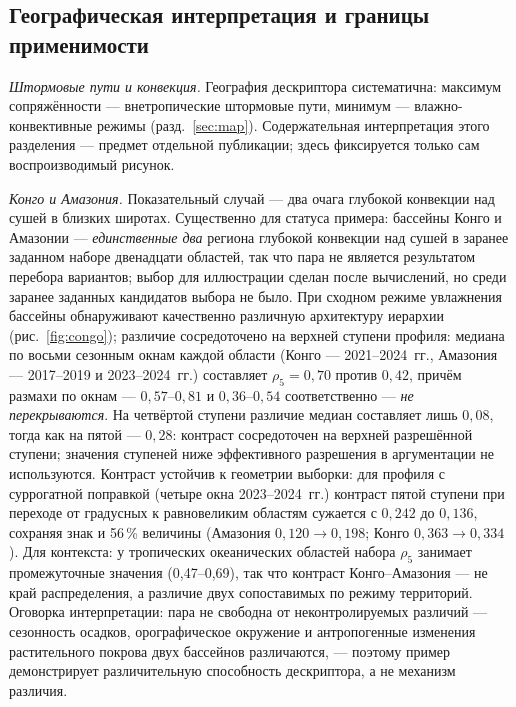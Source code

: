 \documentclass[11pt,a4paper]{article}
\begin{document}
\subsection{Географическая интерпретация и границы применимости}
\label{sec:geo}

\emph{Штормовые пути и конвекция.} География дескриптора систематична: максимум сопряжённости --- внетропические штормовые пути, минимум --- влажно-конвективные режимы (разд.~\ref{sec:map}). Содержательная интерпретация этого разделения --- предмет отдельной публикации; здесь фиксируется только сам воспроизводимый рисунок.

\emph{Конго и Амазония.} Показательный случай --- два очага глубокой конвекции над сушей в близких широтах. Существенно для статуса примера: бассейны Конго и Амазонии --- \emph{единственные два} региона глубокой конвекции над сушей в заранее заданном наборе двенадцати областей, так что пара не является результатом перебора вариантов; выбор для иллюстрации сделан после вычислений, но среди заранее заданных кандидатов выбора не было. При сходном режиме увлажнения бассейны обнаруживают качественно различную архитектуру иерархии (рис.~\ref{fig:congo}); различие сосредоточено на верхней ступени профиля: медиана по восьми сезонным окнам каждой области (Конго --- 2021--2024~гг., Амазония --- 2017--2019 и 2023--2024~гг.) составляет $\rho_5=0{,}70$ против $0{,}42$, причём размахи по окнам --- $0{,}57$--$0{,}81$ и $0{,}36$--$0{,}54$ соответственно --- \emph{не перекрываются}. На четвёртой ступени различие медиан составляет лишь $0{,}08$, тогда как на пятой --- $0{,}28$: контраст сосредоточен на верхней разрешённой ступени; значения ступеней ниже эффективного разрешения в аргументации не используются. Контраст устойчив к геометрии выборки: для профиля с суррогатной поправкой (четыре окна 2023--2024~гг.) контраст пятой ступени при переходе от градусных к равновеликим областям сужается с $0{,}242$ до $0{,}136$, сохраняя знак и 56\,\% величины (Амазония $0{,}120\to0{,}198$; Конго $0{,}363\to0{,}334$). Для контекста: у тропических океанических областей набора $\rho_5$ занимает промежуточные значения (0,47--0,69), так что контраст Конго--Амазония --- не край распределения, а различие двух сопоставимых по режиму территорий. Оговорка интерпретации: пара не свободна от неконтролируемых различий --- сезонность осадков, орографическое окружение и антропогенные изменения растительного покрова двух бассейнов различаются, --- поэтому пример демонстрирует различительную способность дескриптора, а не механизм различия.
\end{document}

